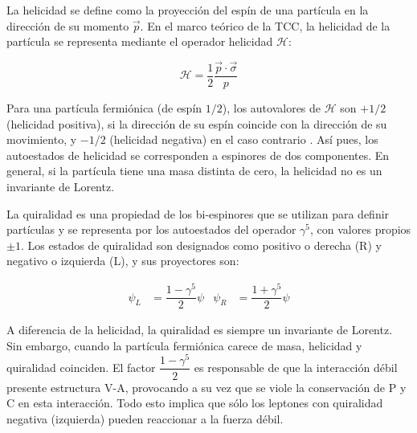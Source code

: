 La helicidad se define como la proyección del espín de una partícula en la dirección de su momento $\vec{p}$. En el marco teórico de la TCC, la helicidad de la partícula se representa mediante el operador helicidad $\mathcal{H}$:

\begin{equation}
\mathcal{H}=\dfrac{1}{2} \dfrac{\vec{p} \cdot \vec{\sigma}}{p}
\end{equation} 

Para una partícula fermiónica (de espín $1/2$), los autovalores de $\mathcal{H}$ son $+1/2$ (helicidad positiva), si la dirección de su espín coincide con la dirección de su movimiento, y $-1/2$ (helicidad negativa) en el caso contrario \cite{Bettini}. Así pues, los autoestados de helicidad se corresponden a espinores de dos componentes. En general, si la partícula tiene una masa distinta de cero, la helicidad no es un invariante de Lorentz.

La quiralidad es una propiedad de los bi-espinores que se utilizan para definir partículas y se representa por los autoestados del operador $\gamma^5$, con valores propios $\pm 1$. Los estados de quiralidad son designados como positivo o derecha (R) y negativo o izquierda (L), y sus proyectores son:

\begin{align}
\psi_L &= \dfrac{1-\gamma^5}{2}\psi & \psi_R &= \dfrac{1+\gamma^5}{2}\psi
\end{align}

A diferencia de la helicidad, la quiralidad es siempre un invariante de Lorentz. Sin embargo, cuando la partícula fermiónica carece de masa, helicidad y quiralidad coinciden.
El factor $\dfrac{1-\gamma^5}{2}$ es responsable de que la interacción débil presente estructura V-A, provocando a su vez que se viole la conservación de P y C en esta interacción. Todo esto implica que sólo los leptones con quiralidad negativa (izquierda) pueden reaccionar a la fuerza débil.